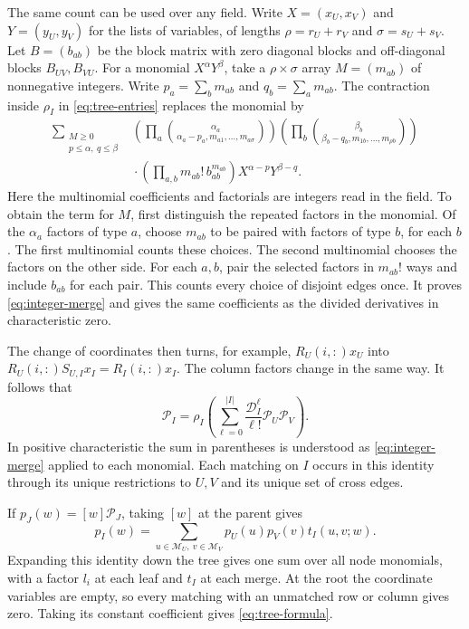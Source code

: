 \documentclass[11pt,reqno]{amsart}
\theoremstyle{remark}
\numberwithin{equation}{section}
\begin{document}
The same count can be used over any field. Write \(X=(x_U,x_V)\)
and \(Y=(y_U,y_V)\) for the lists of variables, of lengths
\(\rho=r_U+r_V\) and \(\sigma=s_U+s_V\). Let \(B=(b_{ab})\) be the
block matrix with zero diagonal blocks and off-diagonal blocks
\(B_{UV},B_{VU}\). For a monomial \(X^\alpha Y^\beta\), take a
\(\rho\times\sigma\) array \(M=(m_{ab})\) of nonnegative integers.
Write \(p_a=\sum_b m_{ab}\) and \(q_b=\sum_a m_{ab}\). The contraction
inside \(\rho_I\) in \eqref{eq:tree-entries} replaces the monomial by
\begin{equation}\label{eq:integer-merge}
\begin{split}
 \sum_{\substack{M\ge0\\p\le\alpha,\ q\le\beta}}
 &\left(\prod_a\binom{\alpha_a}{\alpha_a-p_a,m_{a1},\ldots,m_{a\sigma}}\right)
  \left(\prod_b\binom{\beta_b}{\beta_b-q_b,m_{1b},\ldots,m_{\rho b}}\right)\\
 &{}\cdot\left(\prod_{a,b}m_{ab}!\,b_{ab}^{m_{ab}}\right)
     X^{\alpha-p}Y^{\beta-q}.
\end{split}
\end{equation}
Here the multinomial coefficients and factorials are integers
read in the field. To obtain the term for \(M\), first distinguish
the repeated factors in the monomial. Of the \(\alpha_a\) factors
of type \(a\), choose \(m_{ab}\) to be paired with factors of
type \(b\), for each \(b\). The first multinomial counts these
choices. The second multinomial chooses the factors on the other
side. For each \(a,b\), pair the selected factors in \(m_{ab}!\)
ways and include \(b_{ab}\) for each pair. This counts every
choice of disjoint edges once. It proves \eqref{eq:integer-merge}
and gives the same coefficients as the divided derivatives in
characteristic zero.

The change of coordinates then turns, for example, \(R_U(i,:)x_U\)
into \(R_U(i,:)S_{U,I}x_I=R_I(i,:)x_I\). The column factors change in
the same way. It follows that
\[
 \mathcal P_I=\rho_I\!\left(
          \sum_{\ell=0}^{|I|}\frac{\mathcal D_I^\ell}{\ell!}
                    \mathcal P_U\mathcal P_V\right).
\]
In positive characteristic the sum in parentheses is understood
as \eqref{eq:integer-merge} applied to each monomial.
Each matching on \(I\) occurs in this identity through its unique
restrictions to \(U,V\) and its unique set of cross edges.

If \(p_J(w)=[w]\mathcal P_J\), taking \([w]\) at the parent gives
\[
 p_I(w)=\sum_{u\in\mathcal M_U,\ v\in\mathcal M_V}
                p_U(u)p_V(v)t_I(u,v;w).
\]
Expanding this identity down the tree gives one sum over all node
monomials, with a factor \(l_i\) at each leaf and \(t_I\) at each merge.
At the root the coordinate variables are empty, so every matching with an
unmatched row or column gives zero. Taking its constant coefficient gives
\eqref{eq:tree-formula}.
\end{document}

